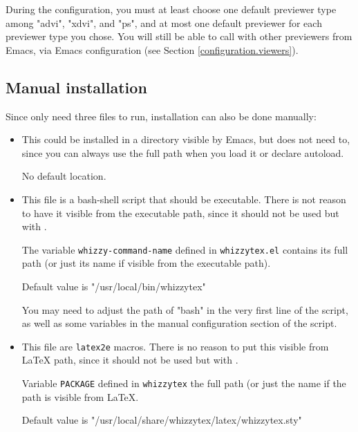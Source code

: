 \documentclass[12pt]{article}
\begin{document}
During the configuration, you must at least choose one default previewer
type among \lst"advi", \lst"xdvi", and \lst"ps", and at most one default
previewer for each previewer type you chose. You will still be able to call
{\whizzy} with other previewers from Emacs, via Emacs configuration (see
Section
\ref {configuration.viewers}). 

\subsection {Manual installation}

Since {\whizzy} only need three files to run, installation can also be done
manually:
\begin {itemize}

\item[]\hspace{-2em}{\tt whizzytex.el}

This could be installed in a directory visible by Emacs, but does not need
to, since you can always use the full path when you load it or declare
autoload. 

No default location.

\item[]\hspace {-2em}{\tt whizzytex}

This file is a bash-shell script that should be executable.  There is not
reason to have it visible from the executable path, since it should not be
used but with {\whizzy}.

The variable {\tt whizzy-command-name} defined in {\tt whizzytex.el} 
contains its full path (or just its name if visible from the executable
path). 

Default value is \lst"/usr/local/bin/whizzytex"

You may  need to adjust the path of \lst"bash" in the very first line of the
script, as well as some variables in the manual configuration section of the
script. 

\item[]\hspace{-2em}{\tt whizzytex.sty}

This file are {\tt latex2e} macros. There is no reason to put this visible
from {\LaTeX} path, since it should not be used but with {\whizzy}.

Variable  {\tt PACKAGE} defined in {\tt whizzytex} 
the full path (or just the name if the path is visible from {\LaTeX}. 

Default value is \lst"/usr/local/share/whizzytex/latex/whizzytex.sty"

\end {itemize}
\end{document}
